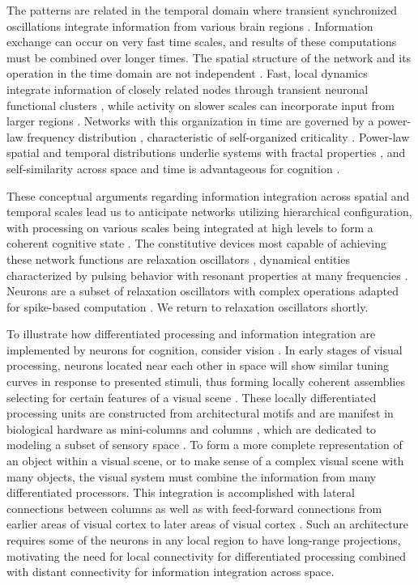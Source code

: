 \documentclass[twocolumn]{article}
\begin{document}
The patterns are related in the temporal domain where transient synchronized oscillations integrate information from various brain regions \cite{vala2001,sase2001,enfr2001}. Information exchange can occur on very fast time scales, and results of these computations must be combined over longer times. The spatial structure of the network and its operation in the time domain are not independent \cite{spto2000,spto2002,waxu2006}. Fast, local dynamics integrate information of closely related nodes through transient neuronal functional clusters \cite{buwa2012}, while activity on slower scales can incorporate input from larger regions \cite{stsa2000}. Networks with this organization in time are governed by a power-law frequency distribution \cite{bata1987,budr2004,bu2006}, characteristic of self-organized criticality \cite{be2007}. Power-law spatial and temporal distributions underlie systems with fractal properties \cite{bata1987,bu2006}, and self-similarity across space and time is advantageous for cognition \cite{bu2006,be2007,kism2009,shya2009,ch2010,rusp2011}. 

These conceptual arguments regarding information integration across spatial and temporal scales lead us to anticipate networks utilizing hierarchical configuration, with processing on various scales being integrated at high levels to form a coherent cognitive state \cite{brto2006}. The constitutive devices most capable of achieving these network functions are relaxation oscillators \cite{bu2006,st2015}, dynamical entities characterized by pulsing behavior \cite{mist1990} with resonant properties at many frequencies \cite{soko1993,huya2000}. Neurons are a subset of relaxation oscillators with complex operations adapted for spike-based computation \cite{geki2002}. We return to relaxation oscillators shortly.

To illustrate how differentiated processing and information integration are implemented by neurons for cognition, consider vision \cite{laus2011}. In early stages of visual processing, neurons located near each other in space will show similar tuning curves \cite{daab2001} in response to presented stimuli, thus forming locally coherent assemblies selecting for certain features of a visual scene \cite{enfr2001}. These locally differentiated processing units are constructed from architectural motifs \cite{spko2004,onsa2005} and are manifest in biological hardware as mini-columns and columns \cite{mo1997}, which are dedicated to modeling a subset of sensory space \cite{haah2017}. To form a more complete representation of an object within a visual scene, or to make sense of a complex visual scene with many objects, the visual system must combine the information from many differentiated processors. This integration is accomplished with lateral connections between columns \cite{spto2000} as well as with feed-forward connections from earlier areas of visual cortex to later areas of visual cortex \cite{laus2011}. Such an architecture requires some of the neurons in any local region to have long-range projections, motivating the need for local connectivity for differentiated processing combined with distant connectivity for information integration across space. 
\end{document}
